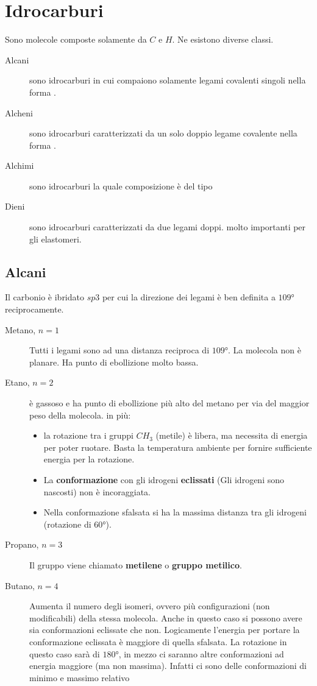 \section{Idrocarburi}
Sono molecole composte solamente da $C$ e $H$. 
Ne esistono diverse classi.
\begin{description}
\item[Alcani] sono idrocarburi in cui compaiono solamente legami covalenti singoli nella forma .
\item[Alcheni] sono idrocarburi caratterizzati da un solo doppio legame covalente nella forma .
\item[Alchimi] sono idrocarburi la quale composizione è del tipo 
\item[Dieni] sono idrocarburi caratterizzati da due legami doppi. molto importanti per gli elastomeri.
\end{description}

\subsection{Alcani}
Il carbonio è ibridato $sp3$ per cui la direzione dei legami è ben definita a $109\unit{\degree}$ reciprocamente.
\begin{description}
\item[Metano, $n = 1$] 
Tutti i legami sono ad una distanza reciproca di $109\unit{\degree}$. La molecola non è planare. Ha punto di ebollizione molto bassa.
\item[Etano, $n=2$]  è gassoso e ha punto di ebollizione più alto del metano per via del maggior peso della molecola.
in più:
\begin{itemize}
\item la rotazione tra i gruppi $CH_3$ (metile) è libera, ma necessita di energia per poter ruotare.
Basta la temperatura ambiente per fornire sufficiente energia per la rotazione.
\item La \textbf{conformazione} con gli idrogeni \textbf{eclissati} (Gli idrogeni sono nascosti) non è incoraggiata.
\item Nella conformazione sfalsata si ha la massima distanza tra gli idrogeni (rotazione di $60\unit{\degree}$).
\end{itemize}
\item[Propano, $n = 3$]  
Il gruppo  viene chiamato \textbf{metilene} o \textbf{gruppo metilico}.
\item[Butano, $n = 4$] 
Aumenta il numero degli isomeri, ovvero più configurazioni (non modificabili) della stessa molecola.
Anche in questo caso si possono avere sia conformazioni eclissate che non.
Logicamente l'energia per portare la conformazione eclissata è maggiore di quella sfalsata. La rotazione in questo caso sarà di $180\unit{\degree}$, in mezzo ci saranno altre conformazioni ad energia maggiore (ma non massima). Infatti ci sono delle conformazioni di minimo e massimo relativo
\end{description}

